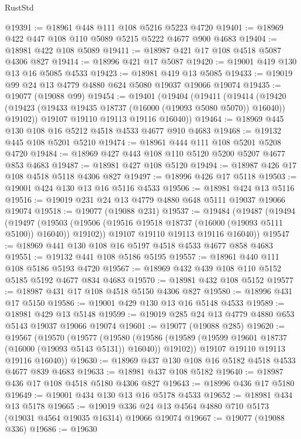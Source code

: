 \begin{lexlean}{RustStd}
\begin{coremodule}
{\begin{coremodule}
{{{{{{{{{{{{{{{{{{{{{{{{{{{{{{{{{{{{{{{{{{{{{{{{{{{{{{{{{{{{@19391 := @18961 @448 @111 @108 @5216 @5223 @4720
@19401 := @18969 @422 @447 @108 @110 @5089 @5215 @5222 @4677 @900 @4683
@19404 := @18981 @422 @108 @5089
@19411 := @18987 @421 @17 @108 @4518 @5087 @4306 @827
@19414 := @18996 @421 @17 @5087
@19420 := @19001 @419 @130 @13 @16 @5085 @4533
@19423 := @18981 @419 @13 @5085
@19433 := @19019 @99 @24 @13 @4779 @4880 @624 @5080 @19037 @19066 @19074
@19435 := @19077 (@19088 @99)
@19454 := @19401
    (@19404
      (@19411
        (@19414
          (@19420 (@19423 (@19433 @19435 @18737 (@16000 (@19093 @5080 @5070)) @16040)) @19102))
        @19107
        @19110
        @19113
        @19116
        @16040))
@19464 := @18969 @445 @130 @108 @16 @5212 @4518 @4533 @4677 @910 @4683
@19468 := @19132 @445 @108 @5201 @5210
@19474 := @18961 @444 @111 @108 @5201 @5208 @4720
@19484 := @18969 @427 @443 @108 @110 @5120 @5200 @5207 @4677 @853 @4683
@19487 := @18981 @427 @108 @5120
@19494 := @18987 @426 @17 @108 @4518 @5118 @4306 @827
@19497 := @18996 @426 @17 @5118
@19503 := @19001 @424 @130 @13 @16 @5116 @4533
@19506 := @18981 @424 @13 @5116
@19516 := @19019 @231 @24 @13 @4779 @4880 @648 @5111 @19037 @19066 @19074
@19518 := @19077 (@19088 @231)
@19537 := @19484
    (@19487
      (@19494
        (@19497
          (@19503 (@19506 (@19516 @19518 @18737 (@16000 (@19093 @5111 @5100)) @16040)) @19102))
        @19107
        @19110
        @19113
        @19116
        @16040))
@19547 := @18969 @441 @130 @108 @16 @5197 @4518 @4533 @4677 @858 @4683
@19551 := @19132 @441 @108 @5186 @5195
@19557 := @18961 @440 @111 @108 @5186 @5193 @4720
@19567 := @18969 @432 @439 @108 @110 @5152 @5185 @5192 @4677 @834 @4683
@19570 := @18981 @432 @108 @5152
@19577 := @18987 @431 @17 @108 @4518 @5150 @4306 @827
@19580 := @18996 @431 @17 @5150
@19586 := @19001 @429 @130 @13 @16 @5148 @4533
@19589 := @18981 @429 @13 @5148
@19599 := @19019 @285 @24 @13 @4779 @4880 @653 @5143 @19037 @19066 @19074
@19601 := @19077 (@19088 @285)
@19620 := @19567
    (@19570
      (@19577
        (@19580
          (@19586 (@19589 (@19599 @19601 @18737 (@16000 (@19093 @5143 @5131)) @16040)) @19102))
        @19107
        @19110
        @19113
        @19116
        @16040))
@19630 := @18969 @437 @130 @108 @16 @5182 @4518 @4533 @4677 @839 @4683
@19633 := @18981 @437 @108 @5182
@19640 := @18987 @436 @17 @108 @4518 @5180 @4306 @827
@19643 := @18996 @436 @17 @5180
@19649 := @19001 @434 @130 @13 @16 @5178 @4533
@19652 := @18981 @434 @13 @5178
@19665 := @19019 @336 @24 @13 @4564 @4880 @710 @5173 (@19031 @4564 @19035 @16314) @19066 @19074
@19667 := @19077 (@19088 @336)
@19686 := @19630
}}}}}}}}}}}}}}}}}}}}}}}}}}}}}}}}}}}}}}}}}}}}}}}}}}}}}}}}}}}}
\end{coremodule}}
\end{coremodule}
\end{lexlean}
